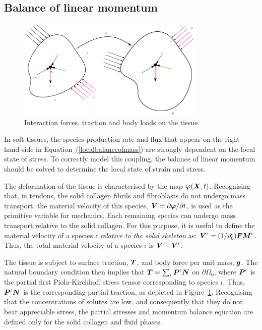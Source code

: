 \subsection{Balance of linear momentum}
\label{balance-of-linear-momentum}

\begin{figure}[ht]
  \centering
  \includegraphics[width=0.8\textwidth]{images/elucidation/cp-momentum}
  \caption{Interaction forces, traction and body loads on the tissue.}
  \label{continuum-potato-momentum}
\end{figure}

In soft tissues, the species production rate and flux that appear on
the right hand-side in Equation~(\ref{localbalanceofmass}) are
strongly dependent on the local state of stress. To correctly model this
coupling, the balance of linear momentum should be solved to determine
the local state of strain and stress.

The deformation of the tissue is characterised by the map
$\mbox{\boldmath$\varphi$}(\mbox{\boldmath$ X$},t)$. Recognising that, in tendons, the solid collagen
fibrils and fibroblasts do not undergo mass transport, the material
velocity of this species, $\mbox{\boldmath$ V$} = \partial\mbox{\boldmath$\varphi$}/\partial t$, is used
as the primitive variable for mechanics. Each remaining species can
undergo mass transport relative to the solid collagen. For this
purpose, it is useful to define the material velocity of a species
$\iota$ \emph{relative to the solid skeleton} as: $\mbox{\boldmath$ V$}^\iota =
(1/\rho_0^\iota)\mbox{\boldmath$ F$}\mbox{\boldmath$ M$}^\iota$. Thus, the total material velocity of a
species $\iota$ is $\mbox{\boldmath$ V$}+\mbox{\boldmath$ V$}^\iota$.

The tissue is subject to surface traction, $\mbox{\boldmath$ T$}$, and body force per
unit mass, $\mbox{\boldmath$ g$}$. The natural boundary condition then implies that
$\mbox{\boldmath$ T$} = \sum_{\iota}\mbox{\boldmath$ P$}^\iota\mbox{\boldmath$ N$}$ on $\partial\Omega_0$, where
$\mbox{\boldmath$ P$}^\iota$ is the partial first Piola-Kirchhoff stress tensor
corresponding to species $\iota$. Thus, $\mbox{\boldmath$ P$}^\iota\mbox{\boldmath$ N$}$ is the
corresponding partial traction, as depicted in
Figure~\ref{continuum-potato-momentum}. Recognising that the
concentrations of solutes are low, and consequently that they do not
bear appreciable stress, the partial stresses and momentum balance
equation are defined only for the solid collagen and fluid phases.

